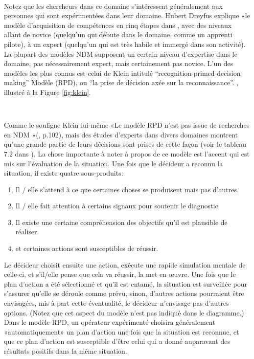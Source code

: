 ~\par
Notez que les chercheurs dans ce domaine s'intéressent généralement aux personnes qui sont expérimentées dans leur domaine. Hubert Dreyfus explique «le modèle d’acquisition de compétences en cinq étapes dans \parencite{dreyfus2014intuitive}, avec des niveaux allant de novice (quelqu'un qui débute dans  le domaine, comme un apprenti pilote), à un expert (quelqu'un qui est très habile et immergé dans son activité). La plupart des modèles NDM supposent un certain niveau d'expertise dans le domaine, pas nécessairement expert, mais certainement pas novice. L’un des modèles les plus connus est celui de Klein intitulé  “recognition-primed decision making” Modèle (RPD),  ou “la prise de décision axée sur la reconnaissance”. \parencite{klein2017sources}, illustré à la Figure \ref{fig:klein}.

~\par
Comme le souligne Klein lui-même «Le modèle RPD n'est pas issue de recherches en NDM »(\parencite{klein2017sources}, p.102), mais des études d’experts dans divers domaines montrent qu’une grande partie de leurs décisions sont prises de cette façon (voir le tableau 7.2 dans \parencite{klein2017sources}). La chose importante à noter à propos de ce modèle est l'accent qui est mis sur l'évaluation de la situation. Une fois que le décideur a reconnu la situation, il existe quatre sous-produits:

\begin{enumerate}

\item Il / elle s'attend à ce que certaines choses se produisent mais pas d'autres.
\item Il / elle fait attention à certains signaux pour soutenir le diagnostic.
\item Il existe une certaine compréhension des objectifs qu'il est plausible de réaliser.
\item et certaines actions sont susceptibles de réussir.
\end{enumerate}

Le décideur choisit ensuite une action, exécute une rapide simulation mentale de
celle-ci, et s'il/elle pense que cela va réussir, la met en œuvre. Une fois que le plan d’action  a été sélectionné et qu’il est entamé, la situation est surveillée pour s’assurer qu’elle se déroule comme prévu, sinon, d’autres actions pourraient être envisagées, mis à part cette éventualité, le décideur n'envisage pas d'autres options. (Notez que cet aspect du modèle n’est pas indiqué dans le diagramme.) Dans le modèle RPD, un opérateur expérimenté
choisira généralement «automatiquement» un plan d’action une fois que la situation est
reconnue, et que ce plan d’action est susceptible d’être celui qui a donné  auparavant
des résultats positifs dans la même situation.


